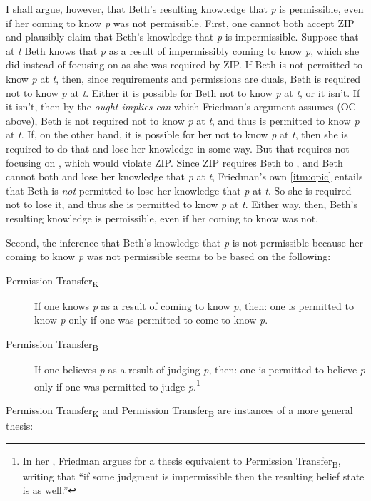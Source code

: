 \documentclass[12pt]{article}
\begin{document}
I shall argue, however, that Beth's resulting knowledge that \textit{p} is permissible, even if her coming to know \textit{p} was not permissible. First, one cannot both accept ZIP and plausibly claim that Beth's knowledge that \textit{p} is impermissible. Suppose that at \textit{t} Beth knows that \textit{p} as a result of impermissibly coming to know \textit{p}, which she did instead of focusing on  as she was required by ZIP. If Beth is not permitted to know \textit{p} at \textit{t}, then, since requirements and permissions are duals, Beth is required not to know \textit{p} at \textit{t}. Either it is possible for Beth not to know \textit{p} at \textit{t}, or it isn't. If it isn't, then by the \textit{ought implies can} which Friedman's argument assumes (OC above), Beth is not required not to know \textit{p} at \textit{t}, and thus is permitted to know \textit{p} at \textit{t}. If, on the other hand, it is possible for her not to know \textit{p} at \textit{t}, then she is required to do that and lose her knowledge in some way. But that requires not focusing on , which would violate ZIP. Since ZIP requires Beth to \foc{}, and Beth cannot both \foc{} and lose her knowledge that \textit{p} at \textit{t}, Friedman's own \ref*{itm:opic} entails that Beth is \textit{not} permitted to lose her knowledge that \textit{p} at \textit{t}. So she is required not to lose it, and thus she is permitted to know \textit{p} at \textit{t}. Either way, then, Beth's resulting knowledge is permissible, even if her coming to know was not.

Second, the inference that Beth's knowledge that \textit{p} is not permissible because her coming to know \textit{p} was not permissible seems to be based on the following:

\newcommand{\pp}{Permission Transfer}
\newcommand{\ppk}{\pp{\textsubscript{K}}}
\newcommand{\ppb}{\pp{\textsubscript{B}}}
\begin{description}
    \item[\ppk] If one knows \textit{p} as a result of coming to know \textit{p}, then: one is permitted to know \textit{p} only if one was permitted to come to know \textit{p}.
    \item[\ppb] If one believes \textit{p} as a result of judging \textit{p}, then: one is permitted to believe \textit{p} only if one was permitted to judge \textit{p}.\footnote{In her \parencite*[p.~689f]{friedman_teleological_2019}, Friedman argues for a thesis equivalent to \ppb{}, writing that ``if some judgment is impermissible then the resulting belief state is as well.''}
\end{description}
%
\ppk{} and \ppb{} are instances of a more general thesis:
\end{document}
